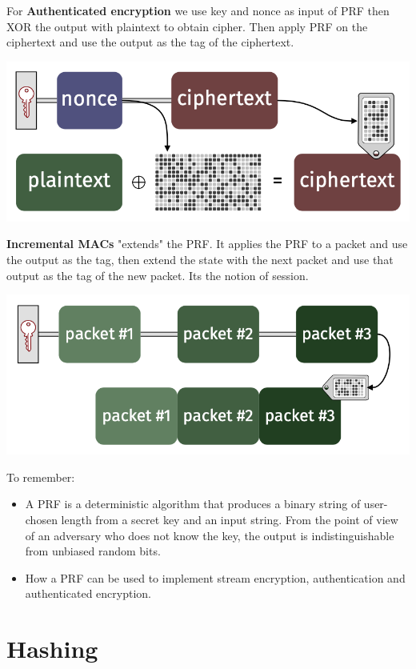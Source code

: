 \documentclass[11pt,a4paper]{report}
\begin{document}
For \textbf{Authenticated encryption} we use key and nonce as input of PRF then XOR the output with plaintext to obtain cipher. Then apply PRF on the ciphertext and use the output as the tag of the ciphertext.
\begin{center}
\includegraphics[scale=0.4]{img/img18.png}
\end{center}

\textbf{Incremental MACs} "extends" the PRF. It applies the PRF to a packet  and use the output as the tag, then extend the state with the next packet and use that output as the tag of the new packet. Its the notion of session.
\begin{center}
\includegraphics[scale=0.4]{img/img19.png}
\end{center}

To remember:
\begin{itemize}
\item A PRF is a deterministic algorithm that produces a binary string of user-chosen length from a secret key and an input string. From the point of view of an adversary who does not know the key, the output is indistinguishable from unbiased random bits.
\item How a PRF can be used to implement stream encryption, authentication and authenticated encryption.
\end{itemize}

\chapter{Hashing}
\end{document}
